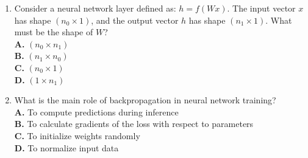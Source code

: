 \documentclass[11pt]{article}
\begin{document}
\begin{enumerate}[label=Q\arabic*., leftmargin=*]
\item Consider a neural network layer defined as: $h = f(Wx)$. The input vector $x$ has shape $(n_0 \times 1)$, and the output vector $h$ has shape $(n_1 \times 1)$. What must be the shape of $W$?\\[0.25em]
\textbf{A.} $(n_0 \times n_1)$\\
\textbf{B.} $(n_1 \times n_0)$\\
\textbf{C.} $(n_0 \times 1)$\\
\textbf{D.} $(1 \times n_1)$

\item What is the main role of backpropagation in neural network training?\\[0.25em]
\textbf{A.} To compute predictions during inference\\
\textbf{B.} To calculate gradients of the loss with respect to parameters\\
\textbf{C.} To initialize weights randomly\\
\textbf{D.} To normalize input data

\end{enumerate}
\end{document}
